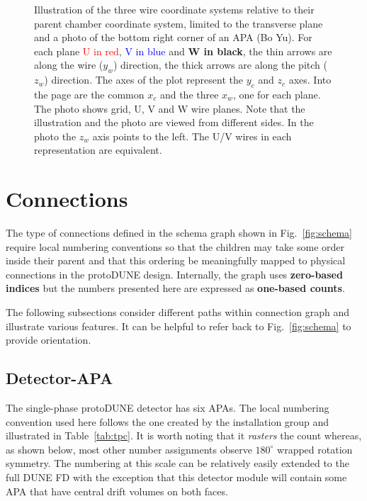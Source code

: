 \documentclass[pdftex,12pt,letter]{article}
\begin{document}
\begin{figure}[htp]
  \caption{Illustration of the three wire coordinate systems relative
    to their parent chamber coordinate system, limited to the
    transverse plane and a photo of the bottom right corner of an APA
    (Bo Yu).  For each plane \textcolor{red}{U in red},
    \textcolor{blue}{V in blue} and \textbf{W in black}, the thin
    arrows are along the wire ($y_w$) direction, the thick arrows are
    along the pitch ($z_w$) direction. The axes of the plot represent
    the $y_c$ and $z_c$ axes.  Into the page are the common $x_c$ and
    the three $x_w$, one for each plane.  The photo shows grid, U, V and W
    wire planes.  Note that the illustration and the photo are viewed
    from different sides.  In the photo the $z_w$ axis points to the
    left.  The U/V wires in each representation are equivalent.}
  \label{fig:coords}
\end{figure}

\section{Connections}

The type of connections defined in the schema graph shown in
Fig.~\ref{fig:schema} require local numbering conventions so that the
children may take some order inside their parent and that this
ordering be meaningfully mapped to physical connections in the
protoDUNE design.  Internally, the graph uses \textbf{zero-based
  indices} but the numbers presented here are expressed as
\textbf{one-based counts}.

The following subsections consider different paths within connection
graph and illustrate various features.  It can be helpful to refer
back to Fig.~\ref{fig:schema} to provide orientation.

\subsection{Detector-APA}

The single-phase protoDUNE detector has six APAs.  The local numbering
convention used here follows the one created by the installation group
and illustrated in Table~\ref{tab:tpc}.  It is worth noting that it
\textit{rasters} the count whereas, as shown below, most other number
assignments observe $180^\circ$ wrapped rotation symmetry.  The
numbering at this scale can be relatively easily extended to the full
DUNE FD with the exception that this detector module will contain some
APA that have central drift volumes on both faces.
\end{document}
